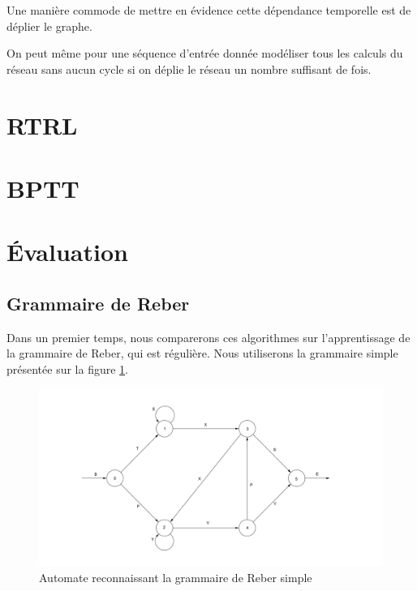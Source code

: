 \documentclass{report}
\theoremstyle{plain}
\theoremstyle{definition}
\theoremstyle{remark}
\begin{document}
Une manière commode de mettre en évidence cette dépendance temporelle est de déplier le graphe. 


On peut même pour une séquence d'entrée donnée modéliser tous les calculs du réseau sans aucun cycle si on déplie le réseau un nombre suffisant de fois.



\section{RTRL}

\section{BPTT}

\section{Évaluation}

\subsection{Grammaire de Reber}

Dans un premier temps, nous comparerons ces algorithmes sur l'apprentissage de la grammaire de Reber, qui est régulière. Nous utiliserons la grammaire simple présentée sur la figure \ref{Grammaire de Reber simple}.

\begin{figure}[h!]
\begin{center}
\includegraphics[scale=0.3]{images/reber_simple.png}
\caption{Automate reconnaissant la grammaire de Reber simple}
\label{Grammaire de Reber simple}
\end{center}
\end{figure}
\end{document}
